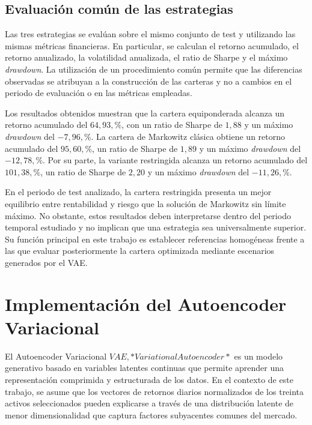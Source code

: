 \subsection{Evaluación común de las estrategias}

Las tres estrategias se evalúan sobre el mismo conjunto de test y utilizando las mismas métricas financieras. En particular, se calculan el retorno acumulado, el retorno anualizado, la volatilidad anualizada, el ratio de Sharpe y el máximo \textit{drawdown}. La utilización de un procedimiento común permite que las diferencias observadas se atribuyan a la construcción de las carteras y no a cambios en el periodo de evaluación o en las métricas empleadas.

Los resultados obtenidos muestran que la cartera equiponderada alcanza un retorno acumulado del \(64{,}93,\%\), con un ratio de Sharpe de \(1{,}88\) y un máximo \textit{drawdown} del \(-7{,}96,\%\). La cartera de Markowitz clásica obtiene un retorno acumulado del \(95{,}60,\%\), un ratio de Sharpe de \(1{,}89\) y un máximo \textit{drawdown} del \(-12{,}78,\%\). Por su parte, la variante restringida alcanza un retorno acumulado del \(101{,}38,\%\), un ratio de Sharpe de \(2{,}20\) y un máximo \textit{drawdown} del \(-11{,}26,\%\).

En el periodo de test analizado, la cartera restringida presenta un mejor equilibrio entre rentabilidad y riesgo que la solución de Markowitz sin límite máximo. No obstante, estos resultados deben interpretarse dentro del periodo temporal estudiado y no implican que una estrategia sea universalmente superior. Su función principal en este trabajo es establecer referencias homogéneas frente a las que evaluar posteriormente la cartera optimizada mediante escenarios generados por el VAE.


\section{Implementación del Autoencoder Variacional}

El Autoencoder Variacional \(VAE, *Variational Autoencoder*\) es un modelo generativo basado en variables latentes continuas que permite aprender una representación comprimida y estructurada de los datos. En el contexto de este trabajo, se asume que los vectores de retornos diarios normalizados de los treinta activos seleccionados pueden explicarse a través de una distribución latente de menor dimensionalidad que captura factores subyacentes comunes del mercado.

